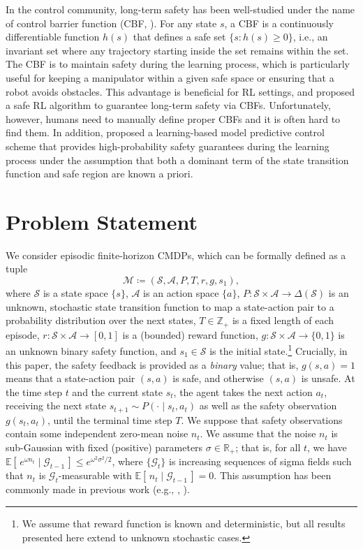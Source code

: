 \documentclass[letterpaper]{article} %
\newcommand{\R}{\mathbb{R}}
\newcommand{\cA}{\mathcal{A}}
\newcommand{\cS}{\mathcal{S}}
\newcommand{\cM}{\mathcal{M}}
\begin{document}
In the control community, long-term safety has been well-studied under the name of control barrier function (CBF, \citet{ames2019control}).
For any state $s$, a CBF is a continuously differentiable function $h(s)$ that defines a safe set $\{s: h(s) \ge 0 \}$, i.e., an invariant set where any trajectory starting inside the set remains within the set.
The CBF is to maintain safety during the learning process, which is particularly useful for keeping a manipulator within a given safe space or ensuring that a robot avoids obstacles.
This advantage is beneficial for RL settings, and \citet{cheng2019end} proposed a safe RL algorithm to guarantee long-term safety via CBFs.
Unfortunately, however, humans need to manually define proper CBFs and it is often hard to find them.
In addition, \citet{koller2018learning} proposed a learning-based model predictive control scheme that provides high-probability safety guarantees during the learning process under the assumption that both a dominant term of the state transition function and safe region are known a priori.

\section{Problem Statement}
\label{sec:problem}

We consider episodic finite-horizon CMDPs, which can be formally defined as a tuple
%
\begin{equation}
    \cM \coloneqq (\cS, \cA, P, T, r, g, s_1),
\end{equation}
%
where $\cS$ is a state space $\{s\}$,
$\cA$ is an action space $\{a\}$,
$P: \cS \times \cA \rightarrow \Delta(\cS)$ is an unknown, stochastic state transition function to map a state-action pair to a probability distribution over the next states,
$T \in \mathbb{Z}_+$ is a fixed length of each episode,
$r: \cS \times \cA \rightarrow [0, 1]$ is a (bounded) reward function,
$g: \cS \times \cA \rightarrow \{0, 1\}$ is an unknown binary safety function, and $s_1 \in \cS$ is the initial state.\footnote{We assume that reward function is known and deterministic, but all results presented here extend to unknown stochastic cases.}
Crucially, in this paper, the safety feedback is provided as a \textit{binary} value; that is, $g(s,a) = 1$ means that a state-action pair $(s,a)$ is safe, and otherwise $(s,a)$ is unsafe.
At the time step $t$ and the current state $s_t$, the agent takes the next action $a_t$, receiving the next state $s_{t+1} \sim P(\cdot \mid s_t, a_t)$ as well as the safety observation $g(s_t, a_t)$, until the terminal time step $T$.
%
We suppose that safety observations contain some independent zero-mean noise $n_t$.
We assume that the noise $n_t$ is sub-Gaussian with fixed (positive) parameters $\sigma \in \R_+$; that is, for all $t$, we have $\mathbb{E} \left [\, e^{\omega n_t} \mid \mathcal{G}_{t-1}\,\right] \le e^{\omega^2 \sigma^2/2}$,
%
where $\{\mathcal{G}_{t}\}$ is increasing sequences of sigma fields such that $n_t$ is $\mathcal{G}_{t}$-measurable with $\mathbb{E} \left[\, n_t \mid \mathcal{G}_{t-1}\, \right]=0$.
This assumption has been commonly made in previous work (e.g., \citet{NIPS2011_e1d5be1c}, \citet{li2017provably}).
\end{document}
